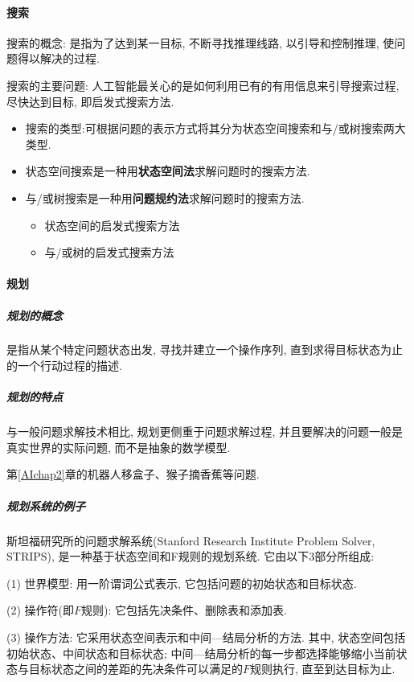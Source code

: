 \paragraph{搜索}

搜索的概念: 是指为了达到某一目标, 不断寻找推理线路, 以引导和控制推理, 使问题得以解决的过程.

搜索的主要问题: 人工智能最关心的是如何利用已有的有用信息来引导搜索过程, 尽快达到目标, 即启发式搜索方法.
\begin{itemize}
\item 搜索的类型:可根据问题的表示方式将其分为状态空间搜索和与/或树搜索两大类型.
\item 状态空间搜索是一种用\textbf{状态空间法}求解问题时的搜索方法.
\item 与/或树搜索是一种用\textbf{问题规约法}求解问题时的搜索方法.
   \begin{itemize}
    \item 状态空间的启发式搜索方法
    \item 与/或树的启发式搜索方法
  \end{itemize}
\end{itemize}
\paragraph{规划}
\subparagraph{规划的概念}
是指从某个特定问题状态出发, 寻找并建立一个操作序列, 直到求得目标状态为止的一个行动过程的描述.
\subparagraph{规划的特点}
与一般问题求解技术相比, 规划更侧重于问题求解过程, 并且要解决的问题一般是真实世界的实际问题, 而不是抽象的数学模型.
\begin{example}
  第\ref{AIchap2}章的机器人移盒子、猴子摘香蕉等问题.
\end{example}
\subparagraph{规划系统的例子}
斯坦福研究所的问题求解系统(Stanford Research Institute Problem Solver,  STRIPS), 是一种基于状态空间和F规则的规划系统. 它由以下3部分所组成:

    (1) 世界模型: 用一阶谓词公式表示, 它包括问题的初始状态和目标状态.

    (2) 操作符(即$F$规则): 它包括先决条件、删除表和添加表.

    (3) 操作方法: 它采用状态空间表示和中间---结局分析的方法. 其中, 状态空间包括初始状态、中间状态和目标状态; 中间---结局分析的每一步都选择能够缩小当前状态与目标状态之间的差距的先决条件可以满足的$F$规则执行, 直至到达目标为止.

